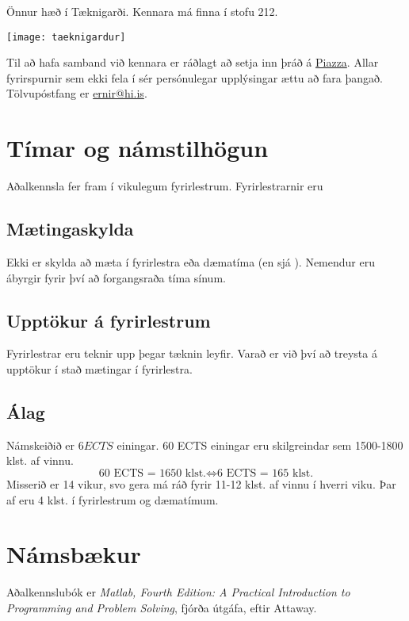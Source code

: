 \documentclass[justified, nobib]{tufte-handout}
\begin{document}
\begin{marginfigure}
\caption{Önnur hæð í Tæknigarði. Kennara má finna í stofu 212.}
\label{fig:taeknigardur}
\begin{center}
\texttt{[image: taeknigardur]}
\end{center}
\end{marginfigure}

Til að hafa samband við kennara er ráðlagt að setja inn þráð á \href{piazza.com/hi.is/fall2017/tl105g/home}{Piazza}. Allar fyrirspurnir sem ekki fela í sér persónulegar upplýsingar ættu að fara þangað. Tölvupóstfang er \href{mailto:ernir@hi.is}{ernir@hi.is}.

\section{Tímar og námstilhögun}
Aðalkennsla fer fram í vikulegum fyrirlestrum. Fyrirlestrarnir eru %


\subsection{Mætingaskylda}
Ekki er skylda að mæta í fyrirlestra eða dæmatíma (en sjá ). Nemendur eru ábyrgir fyrir því að forgangsraða tíma sínum.
\subsection{Upptökur á fyrirlestrum}
Fyrirlestrar eru teknir upp þegar tæknin leyfir. Varað er við því að treysta á upptökur í stað mætingar í fyrirlestra.
\subsection{Álag}
Námskeiðið er $6 ECTS$ einingar. 60 ECTS einingar eru skilgreindar sem 1500-1800 klst. af vinnu.
\[
\text{60 ECTS = 1650 klst.} \Longleftrightarrow \text{6 ECTS = 165 klst.}
\]
Misserið er 14 vikur, svo gera má ráð fyrir 11-12 klst. af vinnu í hverri viku. Þar af eru 4 klst. í fyrirlestrum og dæmatímum.
\section{Námsbækur}
Aðalkennslubók er \emph{Matlab, Fourth Edition: A Practical Introduction to Programming and Problem Solving}, fjórða útgáfa, eftir Attaway.
\end{document}
